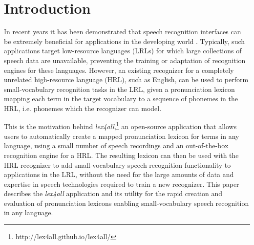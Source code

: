 \documentclass[11pt]{article}
\begin{document}
\section{Introduction}
\label{sec:intro}

In recent years it has been demonstrated that speech recognition interfaces can be extremely beneficial for applications in the developing world
 \cite{case4st4d,Sherwani09,bali13}. 
Typically, 
such applications target low-resource languages (LRLs) for which large collections of speech data are unavailable, preventing the training or adaptation of recognition engines for these languages.
However, 
an existing recognizer for a completely unrelated high-resource language (HRL), such as English, can be used to perform small-vocabulary recognition tasks in the LRL,
given a pronunciation lexicon mapping each term in the target vocabulary to a sequence of phonemes in the HRL, i.e. phonemes which the recognizer can model. 

This is the motivation behind \textit{lex4all},\footnote{http://lex4all.github.io/lex4all/} an open-source application that allows users to automatically create a mapped pronunciation lexicon for terms in any language, using a small number of speech recordings and an out-of-the-box recognition engine for a HRL. The resulting lexicon can then be used with the HRL recognizer to add small-vocabulary speech recognition functionality to applications in the LRL, without the need for the large amounts of data and expertise in speech technologies required to train a new recognizer. This paper describes the \textit{lex4all} application and its utility for the rapid
creation and evaluation of pronunciation lexicons enabling small-vocabulary speech recognition in any language.
\end{document}
